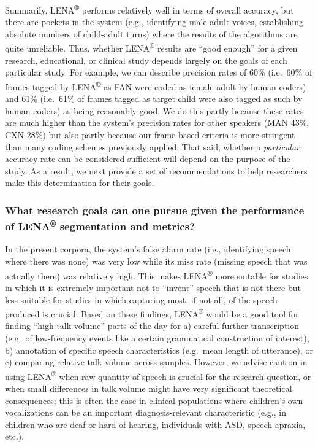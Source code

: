 \documentclass[english,table,man,floatsintext]{apa6}
\begin{document}
Summarily, LENA\textsuperscript{®} performs relatively well in terms of overall accuracy, but there are pockets in the system (e.g., identifying male adult voices, establishing absolute numbers of child-adult turns) where the results of the algorithms are quite unreliable. Thus, whether LENA\textsuperscript{®} results are \enquote{good enough} for a given research, educational, or clinical study depends largely on the goals of each particular study. For example, we can describe precision rates of 60\% (i.e.~60\% of frames tagged by LENA\textsuperscript{®} as FAN were coded as female adult by human coders) and 61\% (i.e.~61\% of frames tagged as target child were also tagged as such by human coders) as being reasonably good. We do this partly because these rates are much higher than the system's precision rates for other speakers (MAN 43\%, CXN 28\%) but also partly because our frame-based criteria is more stringent than many coding schemes previously applied. That said, whether a \emph{particular} accuracy rate can be considered sufficient will depend on the purpose of the study. As a result, we next provide a set of recommendations to help researchers make this determination for their goals.

\hypertarget{what-research-goals-can-one-pursue-given-the-performance-of-lena-segmentation-and-metrics}{%
\subsubsection{\texorpdfstring{What research goals can one pursue given the performance of LENA\textsuperscript{®} segmentation and metrics?}{What research goals can one pursue given the performance of LENA® segmentation and metrics?}}\label{what-research-goals-can-one-pursue-given-the-performance-of-lena-segmentation-and-metrics}}

In the present corpora, the system's false alarm rate (i.e., identifying speech where there was none) was very low while its miss rate (missing speech that was actually there) was relatively high. This makes LENA\textsuperscript{®} more suitable for studies in which it is extremely important not to \enquote{invent} speech that is not there but less suitable for studies in which capturing most, if not all, of the speech produced is crucial. Based on these findings, LENA\textsuperscript{®} would be a good tool for finding \enquote{high talk volume} parts of the day for a) careful further transcription (e.g.~of low-frequency events like a certain grammatical construction of interest), b) annotation of specific speech characteristics (e.g.~mean length of utterance), or c) comparing relative talk volume across samples. However, we advise caution in using LENA\textsuperscript{®} when raw quantity of speech is crucial for the research question, or when small differences in talk volume might have very significant theoretical consequences; this is often the case in clinical populations where children's own vocalizations can be an important diagnosis-relevant characteristic (e.g., in children who are deaf or hard of hearing, individuals with ASD, speech apraxia, etc.).
\end{document}
